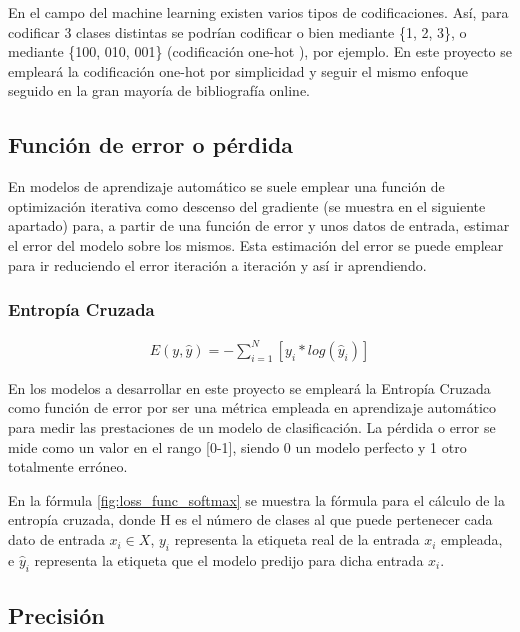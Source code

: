 En el campo del machine learning existen varios tipos de codificaciones. Así, para codificar 3 clases distintas se podrían codificar o bien mediante \{1, 2, 3\}, o mediante \{100, 010, 001\} (codificación one-hot \cite{one_hot}), por ejemplo. En este proyecto se empleará la codificación one-hot por simplicidad y seguir el mismo enfoque seguido en la gran mayoría de bibliografía online.

\subsection{Función de error o pérdida}

En modelos de aprendizaje automático se suele emplear una función de optimización iterativa como descenso del gradiente (se muestra en el siguiente apartado) para, a partir de una función de error y unos datos de entrada, estimar el error del modelo sobre los mismos. Esta estimación del error se puede emplear para ir reduciendo el error iteración a iteración y así ir aprendiendo. 

\subsubsection{Entropía Cruzada}

\begin{gather}
	E(y, \hat{y}) = - \sum_{i=1}^{N}  [y_i * log( \hat{y}_i)]
	\label{fig:loss_func_softmax}
\end{gather}

En los modelos a desarrollar en este proyecto se empleará la Entropía Cruzada como función de error por ser una métrica empleada en aprendizaje automático para medir las prestaciones de un modelo de clasificación. La pérdida o error se mide como un valor en el rango [0-1], siendo 0 un modelo perfecto y 1 otro totalmente erróneo. \cite{Cross_entropy}

En la fórmula \ref{fig:loss_func_softmax} se muestra la fórmula para el cálculo de la entropía cruzada, donde H es el número de clases al que puede pertenecer cada dato de entrada $x_i \in X$, $y_i$ representa la etiqueta real de la entrada $x_i$ empleada, e $\hat{y}_i$ representa la etiqueta que el modelo predijo para dicha entrada $x_i$.  \\

\subsection{Precisión}

